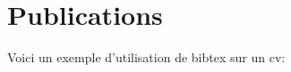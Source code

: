 \documentclass[11pt,a4paper]{moderncv}
\begin{document}
\section{Publications}
\hspace{3cm}Voici un exemple d'utilisation de bibtex sur un cv:
\nocite{*}

\renewcommand{\refname}{}
\end{document}

